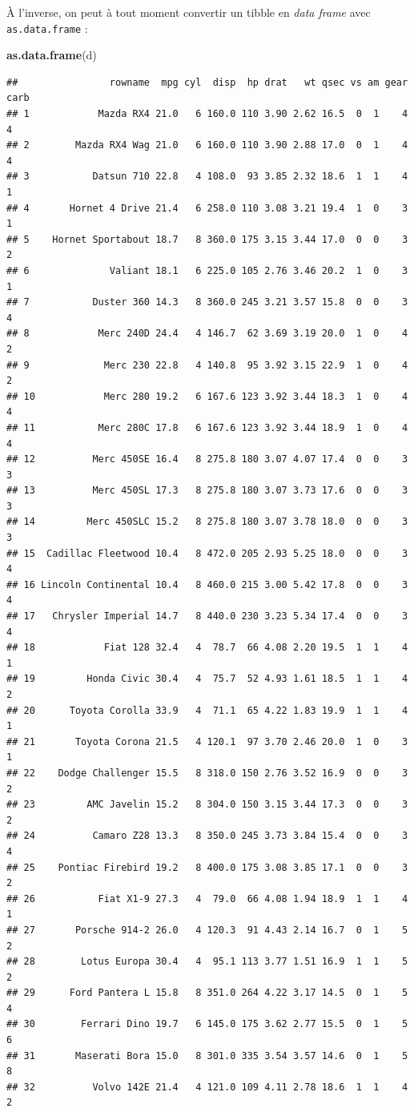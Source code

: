 \documentclass[]{book}
\newenvironment{Shaded}{\begin{snugshade}}{\end{snugshade}}
\newcommand{\KeywordTok}[1]{\textcolor[rgb]{0.13,0.29,0.53}{\textbf{#1}}}
\newcommand{\NormalTok}[1]{#1}
\begin{document}
À l'inverse, on peut à tout moment convertir un tibble en \emph{data
frame} avec \texttt{as.data.frame} :

\begin{Shaded}
\begin{Highlighting}[]
\KeywordTok{as.data.frame}\NormalTok{(d)}
\end{Highlighting}
\end{Shaded}

\begin{verbatim}
##                rowname  mpg cyl  disp  hp drat   wt qsec vs am gear carb
## 1            Mazda RX4 21.0   6 160.0 110 3.90 2.62 16.5  0  1    4    4
## 2        Mazda RX4 Wag 21.0   6 160.0 110 3.90 2.88 17.0  0  1    4    4
## 3           Datsun 710 22.8   4 108.0  93 3.85 2.32 18.6  1  1    4    1
## 4       Hornet 4 Drive 21.4   6 258.0 110 3.08 3.21 19.4  1  0    3    1
## 5    Hornet Sportabout 18.7   8 360.0 175 3.15 3.44 17.0  0  0    3    2
## 6              Valiant 18.1   6 225.0 105 2.76 3.46 20.2  1  0    3    1
## 7           Duster 360 14.3   8 360.0 245 3.21 3.57 15.8  0  0    3    4
## 8            Merc 240D 24.4   4 146.7  62 3.69 3.19 20.0  1  0    4    2
## 9             Merc 230 22.8   4 140.8  95 3.92 3.15 22.9  1  0    4    2
## 10            Merc 280 19.2   6 167.6 123 3.92 3.44 18.3  1  0    4    4
## 11           Merc 280C 17.8   6 167.6 123 3.92 3.44 18.9  1  0    4    4
## 12          Merc 450SE 16.4   8 275.8 180 3.07 4.07 17.4  0  0    3    3
## 13          Merc 450SL 17.3   8 275.8 180 3.07 3.73 17.6  0  0    3    3
## 14         Merc 450SLC 15.2   8 275.8 180 3.07 3.78 18.0  0  0    3    3
## 15  Cadillac Fleetwood 10.4   8 472.0 205 2.93 5.25 18.0  0  0    3    4
## 16 Lincoln Continental 10.4   8 460.0 215 3.00 5.42 17.8  0  0    3    4
## 17   Chrysler Imperial 14.7   8 440.0 230 3.23 5.34 17.4  0  0    3    4
## 18            Fiat 128 32.4   4  78.7  66 4.08 2.20 19.5  1  1    4    1
## 19         Honda Civic 30.4   4  75.7  52 4.93 1.61 18.5  1  1    4    2
## 20      Toyota Corolla 33.9   4  71.1  65 4.22 1.83 19.9  1  1    4    1
## 21       Toyota Corona 21.5   4 120.1  97 3.70 2.46 20.0  1  0    3    1
## 22    Dodge Challenger 15.5   8 318.0 150 2.76 3.52 16.9  0  0    3    2
## 23         AMC Javelin 15.2   8 304.0 150 3.15 3.44 17.3  0  0    3    2
## 24          Camaro Z28 13.3   8 350.0 245 3.73 3.84 15.4  0  0    3    4
## 25    Pontiac Firebird 19.2   8 400.0 175 3.08 3.85 17.1  0  0    3    2
## 26           Fiat X1-9 27.3   4  79.0  66 4.08 1.94 18.9  1  1    4    1
## 27       Porsche 914-2 26.0   4 120.3  91 4.43 2.14 16.7  0  1    5    2
## 28        Lotus Europa 30.4   4  95.1 113 3.77 1.51 16.9  1  1    5    2
## 29      Ford Pantera L 15.8   8 351.0 264 4.22 3.17 14.5  0  1    5    4
## 30        Ferrari Dino 19.7   6 145.0 175 3.62 2.77 15.5  0  1    5    6
## 31       Maserati Bora 15.0   8 301.0 335 3.54 3.57 14.6  0  1    5    8
## 32          Volvo 142E 21.4   4 121.0 109 4.11 2.78 18.6  1  1    4    2
\end{verbatim}
\end{document}
